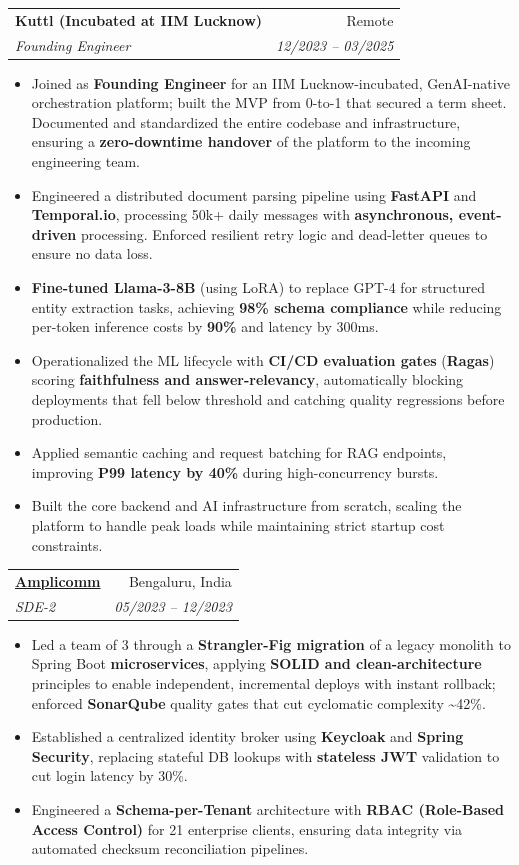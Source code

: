 \documentclass[11pt,a4paper]{article}
\makeatletter
\newcommand{\resumeItem}[1]{
  \item\small{
    {#1 \vspace{-2pt}}
  }
}
\newcommand{\resumeSubheading}[4]{
  \vspace{-1pt}\item
    \begin{tabular*}{0.97\textwidth}[t]{l@{\extracolsep{\fill}}r}
      \textbf{#1} & #2 \\
      \textit{\small#3} & \textit{\small #4} \\
    \end{tabular*}\vspace{-5pt}
}
\newcommand{\resumeItemListStart}{\begin{itemize}[itemsep=2pt, topsep=0pt, partopsep=0pt]}
\newcommand{\resumeItemListEnd}{\end{itemize}\vspace{-5pt}}
\makeatother
\begin{document}
    \resumeSubheading
      {Kuttl (Incubated at IIM Lucknow)}{Remote}
      {Founding Engineer}{12/2023 -- 03/2025}
      \resumeItemListStart
        \resumeItem{Joined as \textbf{Founding Engineer} for an IIM Lucknow-incubated, GenAI-native orchestration platform; built the MVP from 0-to-1 that secured a term sheet. Documented and standardized the entire codebase and infrastructure, ensuring a \textbf{zero-downtime handover} of the platform to the incoming engineering team.}
        \resumeItem{Engineered a distributed document parsing pipeline using \textbf{FastAPI} and \textbf{Temporal.io}, processing 50k+ daily messages with \textbf{asynchronous, event-driven} processing. Enforced resilient retry logic and dead-letter queues to ensure no data loss.}
        \resumeItem{\textbf{Fine-tuned Llama-3-8B} (using LoRA) to replace GPT-4 for structured entity extraction tasks, achieving \textbf{98\% schema compliance} while reducing per-token inference costs by \textbf{90\%} and latency by 300ms.}
        \resumeItem{Operationalized the ML lifecycle with \textbf{CI/CD evaluation gates} (\textbf{Ragas}) scoring \textbf{faithfulness and answer-relevancy}, automatically blocking deployments that fell below threshold and catching quality regressions before production.}
        \resumeItem{Applied semantic caching and request batching for RAG endpoints, improving \textbf{P99 latency by 40\%} during high-concurrency bursts.}
        \resumeItem{Built the core backend and AI infrastructure from scratch, scaling the platform to handle peak loads while maintaining strict startup cost constraints.}
      \resumeItemListEnd

    \resumeSubheading
      {\href{https://amplicomm.com/}{Amplicomm}}{Bengaluru, India}
      {SDE-2}{05/2023 -- 12/2023}
      \resumeItemListStart
        \resumeItem{Led a team of 3 through a \textbf{Strangler-Fig migration} of a legacy monolith to Spring Boot \textbf{microservices}, applying \textbf{SOLID and clean-architecture} principles to enable independent, incremental deploys with instant rollback; enforced \textbf{SonarQube} quality gates that cut cyclomatic complexity \textasciitilde{}42\%.}
        \resumeItem{Established a centralized identity broker using \textbf{Keycloak} and \textbf{Spring Security}, replacing stateful DB lookups with \textbf{stateless JWT} validation to cut login latency by 30\%.}
        \resumeItem{Engineered a \textbf{Schema-per-Tenant} architecture with \textbf{RBAC (Role-Based Access Control)} for 21 enterprise clients, ensuring data integrity via automated checksum reconciliation pipelines.}
      \resumeItemListEnd
\end{document}
